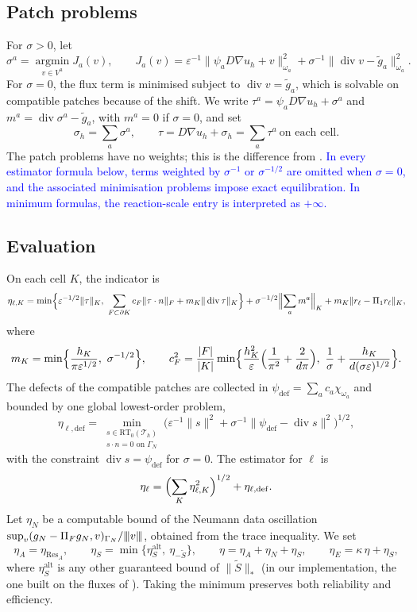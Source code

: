 \documentclass[11pt]{article}
\newcommand{\rev}[1]{\textcolor{blue}{#1}}
\newcommand{\tnorm}[1]{\lvert\kern-0.25ex\lvert\kern-0.25ex\lvert #1\rvert\kern-0.25ex\rvert\kern-0.25ex\rvert}
\newcommand{\eps}{\varepsilon}
\newcommand{\Res}{\operatorname{Res}}
\newcommand{\Stil}{\tilde S}
\newcommand{\RT}{\mathrm{RT}}
\newcommand{\dv}{\operatorname{div}}
\newcommand{\defe}{\mathrm{def}}
\theoremstyle{plain}
\theoremstyle{remark}
\numberwithin{equation}{section}
\begin{document}
\subsection{Patch problems}

For $\sigma>0$, let
\[
  \sigma^a=\operatorname*{argmin}_{v\in V^a} J_a(v),\qquad
  J_a(v)=\eps^{-1}\|\psi_a D\nabla u_h+v\|_{\omega_a}^2+\sigma^{-1}\|\dv v-\tilde g_a\|_{\omega_a}^2.
\]
For $\sigma=0$, the flux term is minimised subject to $\dv v=\tilde g_a$, which is solvable on
compatible patches because of the shift. We write $\tau^a=\psi_a D\nabla u_h+\sigma^a$ and
$m^a=\dv\sigma^a-\tilde g_a$, with $m^a=0$ if $\sigma=0$, and set
\[
\sigma_h=\sum_a\sigma^a,\qquad \tau=D\nabla u_h+\sigma_h=\sum_a\tau^a\ \text{on each cell}.
\]
The patch problems have no weights; this is the difference from \cite{SV20}.
\rev{In every estimator formula below, terms weighted by $\sigma^{-1}$ or $\sigma^{-1/2}$ are
omitted when $\sigma=0$, and the associated minimisation problems impose exact equilibration.
In minimum formulas, the reaction-scale entry is interpreted as $+\infty$.}

\subsection{Evaluation}

On each cell $K$, the indicator is
\begin{equation}\label{eq:indicator}
  \eta_{\ell,K}=\min\Bigl\{\eps^{-1/2}\|\tau\|_K,\ \sum_{F\subset\partial K}c_F\|\tau\cdot n\|_F+m_K\|\dv\tau\|_K\Bigr\}
  +\sigma^{-1/2}\Bigl\|\sum_a m^a\Bigr\|_K+m_K\|r_\ell-\Pi_1 r_\ell\|_K,
\end{equation}
where
\[
  m_K=\min\Bigl\{\frac{h_K}{\pi\eps^{1/2}},\ \sigma^{-1/2}\Bigr\},\qquad
  c_F^2=\frac{|F|}{|K|}\min\Bigl\{\frac{h_K^2}{\eps}\Bigl(\frac1{\pi^2}+\frac{2}{d\pi}\Bigr),\
  \frac1\sigma+\frac{h_K}{d(\sigma\eps)^{1/2}}\Bigr\}.
\]
The defects of the compatible patches are collected in
$\psi_\defe=\sum_a c_a\chi_{\omega_a}$ and bounded by one global lowest-order problem,
\[
  \eta_{\ell,\defe}=\min_{\substack{s\in\RT_0(\mathcal T_h)\\ s\cdot n=0\text{ on }\Gamma_N}}
  \bigl(\eps^{-1}\|s\|^2+\sigma^{-1}\|\psi_\defe-\dv s\|^2\bigr)^{1/2},
\]
with the constraint $\dv s=\psi_\defe$ for $\sigma=0$. The estimator for $\ell$ is
\[
  \eta_\ell=\Bigl(\sum_K\eta_{\ell,K}^2\Bigr)^{1/2}+\eta_{\ell,\defe}.
\]
Let $\eta_N$ be a computable bound of the Neumann data oscillation
$\sup_v(g_N-\Pi_Fg_N,v)_{\Gamma_N}/\tnorm{v}$, obtained from the trace inequality. We set
\[
  \eta_A=\eta_{\Res_A},\qquad
  \eta_S=\min\{\eta_S^{\mathrm{alt}},\ \eta_{-\Stil}\},\qquad
  \eta=\eta_A+\eta_N+\eta_S,\qquad
  \eta_E=\kappa\,\eta+\eta_S,
\]
where $\eta_S^{\mathrm{alt}}$ is any other guaranteed bound of $\|\Stil\|_*$ (in our implementation,
the one built on the fluxes of \cite{ABR17}). Taking the minimum preserves both reliability and
efficiency.
\end{document}
